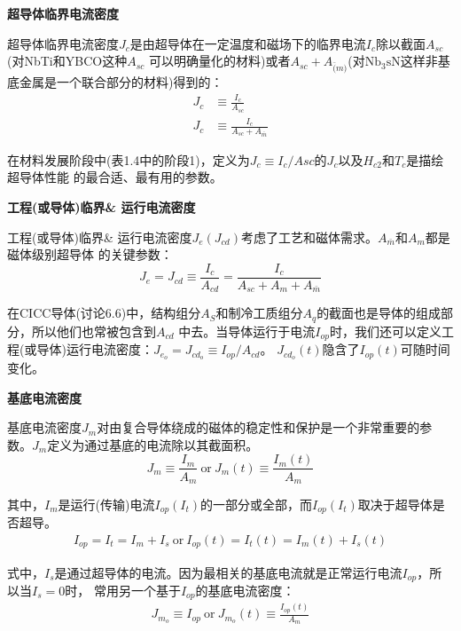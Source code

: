 \textbf{超导体临界电流密度}

超导体临界电流密度$J_c$是由超导体在一定温度和磁场下的临界电流$I_c$除以截面$A_{sc}$(对NbTi和YBCO这种$A_{sc}$
可以明确量化的材料)或者$A_{sc}+A_{\bar(m)}$(对$\mathrm{Nb_3 sN}$这样非基底金属是一个联合部分的材料)得到的：
\begin{subequations}
	\begin{align}
	J_c&\equiv\frac{I_c}{A_{sc}}\\
	J_c&\equiv\frac{I_c}{A_{sc}+A_{\bar{m}}}
	\end{align}
\end{subequations}

在材料发展阶段中(表1.4中的阶段1)，定义为$J_c\equiv I_c/A{sc}$的$J_c$以及$H_{c2}$和$T_c$是描绘超导体性能
的最合适、最有用的参数。

\textbf{工程(或导体)临界\& 运行电流密度}

工程(或导体)临界\& 运行电流密度$J_e (J_{cd})$考虑了工艺和磁体需求。$A_{\bar{m}}$和$A_m$都是磁体级别超导体
的关键参数：
\begin{equation}%
J_e=J_{cd}\equiv\frac{I_c}{A_{cd}}=\frac{I_c}{A_{sc}+A_m+A_{\bar{m}}}
\end{equation}

在CICC导体(讨论6.6)中，结构组分$A_S$和制冷工质组分$A_q$的截面也是导体的组成部分，所以他们也常被包含到$A_{cd}$
中去。当导体运行于电流$I_{op}$时，我们还可以定义工程(或导体)运行电流密度：$J_{e_o}=J_{cd_o}\equiv I_{op}/A_{cd}$。
$J_{cd_o}(t)$隐含了$I_{op}(t)$可随时间变化。

\textbf{基底电流密度}

基底电流密度$J_m$对由复合导体绕成的磁体的稳定性和保护是一个非常重要的参数。$J_m$定义为通过基底的电流除以其截面积。
\begin{equation}%
J_{m}\equiv\frac{I_m}{A_m}    \ \mbox{or}\    J_m(t)\equiv\frac{I_m(t)}{A_m}
\end{equation}

其中，$I_m$是运行(传输)电流$I_{op}(I_t)$的一部分或全部，而$I_{op}(I_t)$取决于超导体是否超导。
\begin{align*}%
I_{op}=I_t=I_m+I_s  \ \mbox{or}\ I_{op}(t)=I_{t}(t)=I_m(t)+I_s(t) \tag{6.7b}
\end{align*}

式中，$I_s$是通过超导体的电流。因为最相关的基底电流就是正常运行电流$I_{op}$，所以当$I_s=0$时，
常用另一个基于$I_{op}$的基底电流密度：
\begin{align*}%
J_{m_o}\equiv I_{op}   \ \mbox{or}\  J_{m_o}(t)\equiv\frac{I_{op}(t)}{A_m} \tag{6.7c}
\end{align*}

